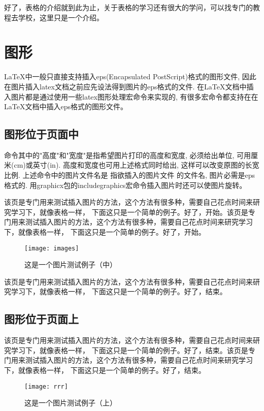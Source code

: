 好了，表格的介绍就到此为止，关于表格的学习还有很大的学问，可以找专门的教程去学校，这里只是一个介绍。

\section{图形}
LaTeX中一般只直接支持插入eps(Encapsulated PostScript)格式的图形文件, 因此在图片插入latex文档之前应先设法得到图片的eps格式的文件.
在LaTeX文档中插入图片都是通过使用一些latex图形处理宏命令来实现的, 有很多宏命令都支持在在LaTeX文档中插入eps格式的图形文件。
\subsection{图形位于页面中}
命令其中的"高度"和"宽度"是指希望图片打印的高度和宽度, 必须给出单位, 可用厘米(cm)或英寸(in). 高度和宽度也可用上述格式同时给出, 这样可以改变原图的长宽比例. 上述命令中的图片文件名是
指欲插入的图片文件 的文件名, 图片必需是eps格式的.
用graphicx包的includegraphics宏命令插入图片时还可以使图片旋转。

该页是专门用来测试插入图片的方法，这个方法有很多种，需要自己花点时间来研究学习下，就像表格一样，
下面这只是一个简单的例子。好了，开始。该页是专门用来测试插入图片的方法，这个方法有很多种，需要自己花点时间来研究学习下，就像表格一样，
下面这只是一个简单的例子。好了，开始。

\begin{figure}[h]
 \centering
 \texttt{[image: images]}
 \caption{这是一个图片测试例子（中）}
 \label{fig:amss1}
\end{figure}

该页是专门用来测试插入图片的方法，这个方法有很多种，需要自己花点时间来研究学习下，就像表格一样，
下面这只是一个简单的例子。好了，结束。

\subsection{图形位于页面上}
该页是专门用来测试插入图片的方法，这个方法有很多种，需要自己花点时间来研究学习下，就像表格一样，
下面这只是一个简单的例子。好了，结束。该页是专门用来测试插入图片的方法，这个方法有很多种，需要自己花点时间来研究学习下，就像表格一样，
下面这只是一个简单的例子。好了，结束。

\begin{figure}[t]
 \centering
 \texttt{[image: rrr]}
 \caption{这是一个图片测试例子（上）}
 \label{fig:amss2}
\end{figure}

